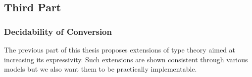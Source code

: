 \documentclass{book}
\begin{document}



\subsection{Third Part}

\subsubsection{Decidability of Conversion}

The previous part of this thesis proposes extensions of type theory
aimed at increasing its expressivity. Such extensions are shown
consistent through various models but we also want them to be
practically implementable.
\end{document}
